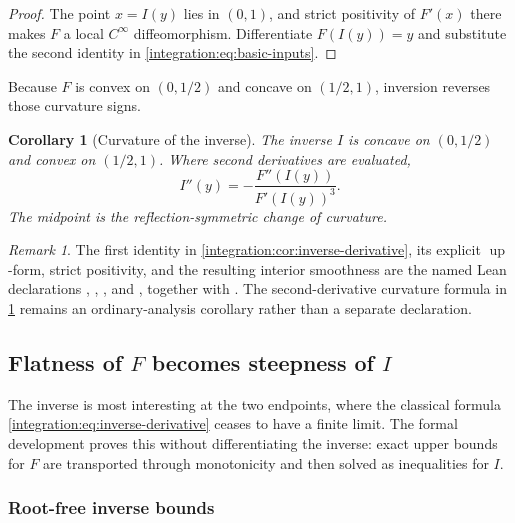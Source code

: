 \documentclass[11pt,oneside]{article}
\newtheorem{corollary}[theorem]{Corollary}
\theoremstyle{definition}
\theoremstyle{remark}
\newtheorem{remark}[theorem]{Remark}
\newcommand{\Up}{\operatorname{up}}
\begin{document}
\begin{proof}
The point $x=I(y)$ lies in $(0,1)$, and strict positivity of $F'(x)$ there makes $F$ a local
$C^\infty$ diffeomorphism.  Differentiate $F(I(y))=y$ and substitute the second identity in
\eqref{integration:eq:basic-inputs}.
\end{proof}

Because $F$ is convex on $(0,1/2)$ and concave on $(1/2,1)$, inversion reverses those
curvature signs.

\begin{corollary}[Curvature of the inverse]
\label{integration:cor:inverse-curvature}
The inverse $I$ is concave on $(0,1/2)$ and convex on $(1/2,1)$.  Where second derivatives
are evaluated,
\begin{equation}
 I''(y)=-\frac{F''(I(y))}{F'(I(y))^3}.
 \label{integration:eq:inverse-second-derivative}
\end{equation}
The midpoint is the reflection-symmetric change of curvature.
\end{corollary}

\begin{remark}
The first identity in \cref{integration:cor:inverse-derivative}, its explicit \(\Up\)-form, strict
positivity, and the resulting interior smoothness are the named Lean declarations
,
, , and
, together with
.  The second-derivative curvature formula in
\cref{integration:cor:inverse-curvature} remains an ordinary-analysis corollary rather than a separate
declaration.
\end{remark}

\subsection{Flatness of \texorpdfstring{$F$}{F} becomes steepness of \texorpdfstring{$I$}{I}}
\label{integration:sec:inverse-steepness}

The inverse is most interesting at the two endpoints, where the classical formula
\eqref{integration:eq:inverse-derivative} ceases to have a finite limit.  The formal development proves
this without differentiating the inverse: exact upper bounds for $F$ are transported through
monotonicity and then solved as inequalities for $I$.

\subsubsection{Root-free inverse bounds}
\end{document}
